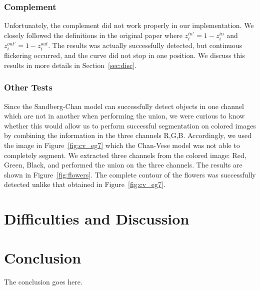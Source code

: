 \documentclass[10pt,twocolumn,letterpaper]{article}
\begin{document}
\subsubsection*{Complement}

Unfortunately, the complement did not work properly in our implementation. We closely followed the definitions in the original paper where $z_i^{in'} = 1 -
z_i^{in}$ and $z_i^{out'} = 1 - z_i^{out}$. The results was actually successfully detected, but continuous flickering occurred, and the curve did not stop in
one position. We discuss this results in more details in Section~\ref{sec:disc}.

\subsubsection*{Other Tests}

Since the Sandberg-Chan model can successfully detect objects in one channel which are not in another when performing the union, we were curious to know
whether this would allow us to perform successful segmentation on colored images by combining the information in the three channels R,G,B. Accordingly, we used
the image in Figure~\ref{fig:cv_eg7} which the Chan-Vese model was not able to completely segment. We extracted three channels from the colored image: Red,
Green, Black, and performed the union on the three channels. The results are shown in Figure~\ref{fig:flowers}. The complete contour of the flowers was
successfully detected unlike that obtained in Figure~\ref{fig:cv_eg7}.

\section{Difficulties and Discussion}
\label{sec:difficulties}



\section{Conclusion}
\label{sec:concl}
The conclusion goes here.








\end{document}
